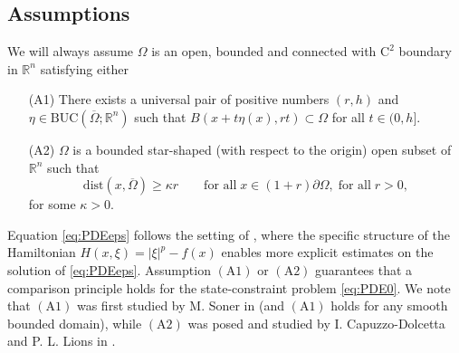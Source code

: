 \documentclass[11pt,reqno]{amsart}
\numberwithin{figure}{section}
\theoremstyle{plain}
\theoremstyle{remark}
\numberwithin{equation}{section}
\begin{document}
\subsection{Assumptions} We will always assume $\Omega$ is an open, bounded and connected with $\mathrm{C}^2$ boundary in $\mathbb{R}^n$ satisfying either %
\begin{itemize}    
    \item[(A1)] There exists a universal pair of positive numbers $(r,h)$ and $\eta\in \mathrm{BUC}(\overline{\Omega};\mathbb{R}^n)$ such that $B(x+t\eta(x), rt)\subset\Omega$ for all $t\in (0,h]$.
    \item[(A2)] $\Omega$ is a bounded star-shaped (with respect to the origin) open subset of $\mathbb{R}^n$ such that
    \begin{equation*}
        \mathrm{dist}(x,\overline{\Omega}) \geq \kappa r \qquad\text{for all}\; x\in (1+r) \partial\Omega, \;\text{for all}\;r>0,
    \end{equation*}
for some $\kappa > 0$.
\end{itemize}
Equation \eqref{eq:PDEeps} follows the setting of \cite{Lasry1989}, where the specific structure of the Hamiltonian $H(x,\xi) = |\xi|^p - f(x)$ enables more explicit estimates on the solution of \eqref{eq:PDEeps}. Assumption $\mathrm{(A1)}$ or $\mathrm{(A2)}$ guarantees that a comparison principle holds for the state-constraint problem \eqref{eq:PDE0}. We note that $\mathrm{(A1)}$ was first studied by M. Soner in \cite{Soner1986} (and $\mathrm{(A1)}$ holds for any smooth bounded domain), while $\mathrm{(A2)}$ was posed and studied by I. Capuzzo-Dolcetta and P. L. Lions in \cite{Capuzzo-Dolcetta1990}. 
\end{document}
